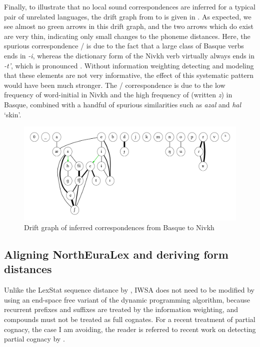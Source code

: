 Finally, to illustrate that no local sound correspondences are inferred for a typical pair of unrelated languages, the drift graph from  to  is given in . As expected, we see almost no green arrows in this drift graph, and the two arrows which do exist are very thin, indicating only small changes to the phoneme distances. Here, the spurious correspondence \ipa{[i]}/\ipa{[c]} is due to the fact that a large class of Basque verbs ends in \textit{-i}, whereas the dictionary form of the Nivkh verb virtually always ends in \textit{-t'}, which is pronounced \ipa{[c]}. Without information weighting detecting and modeling that these elements are not very informative, the effect of this systematic pattern would have been much stronger. The \ipa{[s]}/\ipa{[h]} correspondence is due to the low frequency of word-initial \ipa{[h]} in Nivkh and the high frequency of \ipa{[s]} (written \textit{z}) in Basque, combined with a handful of spurious similarities such as \textit{azal} and \textit{hal} `skin'.

\begin{figure}
    \includegraphics[width=\textwidth]{figures/drift-graph-eu-niv.pdf}
    \caption{Drift graph of inferred correspondences from Basque to Nivkh}
    \label{fig:driftGraphEuNiv}
\end{figure}

\subsection{Aligning NorthEuraLex and deriving form distances}

Unlike the LexStat sequence distance by \cite{list2012}, IWSA does not need to be modified by using an end-space free variant of the dynamic programming algorithm, because recurrent prefixes and suffixes are treated by the information weighting, and compounds must not be treated as full cognates. For a recent treatment of partial cognacy, the case I am avoiding, the reader is referred to recent work on detecting partial cognacy by \cite{list_ea_2016}.

